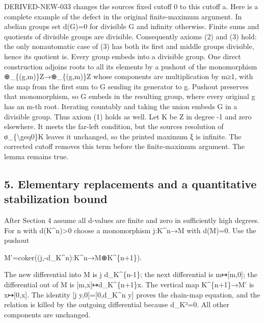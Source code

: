 DERIVED-NEW-033 changes the source\textquotesingle s fixed cutoff 0 to this cutoff a. Here is a complete example of the defect in the original finite-maximum argument. In abelian groups set d(G)\allowbreak{}\allowbreak{}=0 for divisible G and infinity otherwise. Finite sums and quotients of divisible groups are divisible. Consequently axioms (2)\allowbreak{} and (3)\allowbreak{} hold:\allowbreak{} the only nonautomatic case of (3)\allowbreak{} has both its first and middle groups divisible,\allowbreak{} hence its quotient is. Every group embeds into a divisible group. One direct construction adjoins roots to all its elements by a pushout of the monomorphism \allowbreak{}⊕\_\allowbreak{}\{(g,\allowbreak{}m)\allowbreak{}\}Z\allowbreak{}→\allowbreak{}⊕\_\allowbreak{}\{(g,\allowbreak{}m)\allowbreak{}\}Z whose components are multiplication by m≥1,\allowbreak{} with the map from the first sum to G sending its generator to g. Pushout preserves that monomorphism,\allowbreak{} so G embeds in the resulting group,\allowbreak{} where every original g has an m-th root. Iterating countably and taking the union embeds G in a divisible group. Thus axiom (1)\allowbreak{} holds as well. Let K be Z in degree -1 and zero elsewhere. It meets the far-left condition,\allowbreak{} but the source\textquotesingle s resolution of σ\_\allowbreak{}\{\textbackslash{}geq0\}K leaves it unchanged,\allowbreak{} so the printed maximum ξ is infinite. The corrected cutoff removes this term before the finite-maximum argument. The lemma remains true.

\subsection{5. Elementary replacements and a quantitative stabilization bound}\label{proofs-9746-10132-elementary-replacements-and-a-quantitative-stabilization-bound}

After Section 4 assume all d-values are finite and zero in sufficiently high degrees. For n with d(K\textasciicircum{}n)\allowbreak{}>0 choose a monomorphism j:\allowbreak{}K\textasciicircum{}n\allowbreak{}→M with d(M)\allowbreak{}\allowbreak{}=0. Use the pushout

M'\allowbreak{}=coker((j,\allowbreak{}-d\_\allowbreak{}K\textasciicircum{}n)\allowbreak{}:\allowbreak{}K\textasciicircum{}n\allowbreak{}→M\allowbreak{}⊕K\textasciicircum{}\{n\allowbreak{}+1\})\allowbreak{}.

The new differential into M is j d\_\allowbreak{}K\textasciicircum{}\{n-1\}; the next differential is m\allowbreak{}↦[m,\allowbreak{}0]\allowbreak{}; the differential out of M\textquotesingle{} is [m,\allowbreak{}x]\allowbreak{}\allowbreak{}↦d\_\allowbreak{}K\textasciicircum{}\{n\allowbreak{}+1\}x. The vertical map K\textasciicircum{}\{n\allowbreak{}+1\}\allowbreak{}→M' is x\allowbreak{}↦[0,\allowbreak{}x]\allowbreak{}. The identity {[}j y,\allowbreak{}0]\allowbreak{}\allowbreak{}=[0,\allowbreak{}d\_\allowbreak{}K\textasciicircum{}n y]\allowbreak{} proves the chain-map equation,\allowbreak{} and the relation is killed by the outgoing differential because d\_\allowbreak{}K²\allowbreak{}=0. All other components are unchanged.

